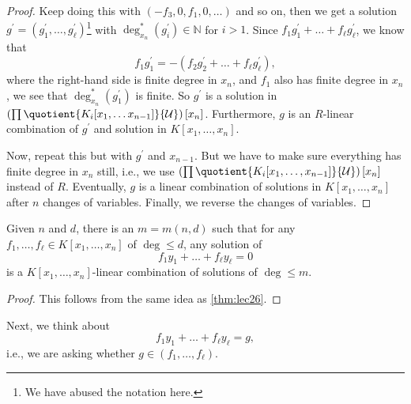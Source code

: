 \begin{proof}
	Keep doing this with \((-f_3, 0, f_1, 0, \dots )\) and so on, then we get a solution \(g^{\prime} = (g_1^{\prime} , \dots , g_{\ell } ^{\prime} )\)\footnote{We have abused the notation here.} with \(\deg^{\ast} _{x_n}(g_i^{\prime} )\in \mathbb{N} \) for \(i > 1\). Since \(f_1 g_1^{\prime} + \dots + f_{\ell } g_{\ell }^{\prime}\), we know that
	\[
		f_1 g_1^{\prime} = -(f_2 g_2^{\prime} + \dots + f_{\ell } g_{\ell } ^{\prime} ),
	\]
	where the right-hand side is finite degree in \(x_n\), and \(f_1\) also has finite degree in \(x_n\), we see that \(\deg^{\ast} _{x_n}(g_1^{\prime} )\) is finite. So \(g^{\prime} \) is a solution in \(\left( \prod \quotient{K_i [x_1, \dots x_{n-1}] }{\mathcal{U} } \right) [x_n]\). Furthermore, \(g\) is an \(R\)-linear combination of \(g^{\prime} \) and solution in \(K[x_1, \dots , x_n]\).

	Now, repeat this but with \(g^{\prime} \) and \(x_{n-1} \). But we have to make sure everything has finite degree in \(x_n\) still, i.e., we use \(\left( \prod \quotient{K_i[x_1, \dots , x_{n-1}]}{\mathcal{U} } \right) [x_n]\) instead of \(R\). Eventually, \(g\) is a linear combination of solutions in \(K[x_1, \dots , x_n]\) after \(n\) changes of variables. Finally, we reverse the changes of variables.
\end{proof}

\begin{theorem}
	Given \(n\) and \(d\), there is an \(m=m(n, d)\) such that for any \(f_1, \dots , f_{\ell }\in K[x_1, \dots , x_n] \) of \(\deg \leq d\), any solution of
	\[
		f_1 y_1 + \dots + f_{\ell } y_{\ell } = 0
	\]
	is a \(K[x_1, \dots , x_n]\)-linear combination of solutions of \(\deg \leq m\).
\end{theorem}
\begin{proof}
	This follows from the same idea as \autoref{thm:lec26}.
\end{proof}

Next, we think about
\[
	f_1 y_1 + \dots + f_{\ell } y_{\ell } = g,
\]
i.e., we are asking whether \(g\in (f_1, \dots , f_{\ell } )\).
